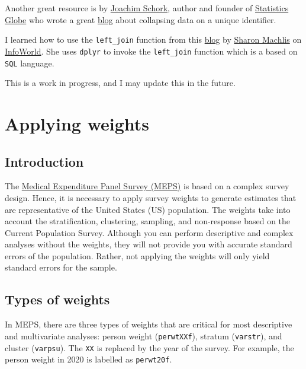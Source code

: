 \documentclass[
]{book}
\theoremstyle{definition}
\theoremstyle{definition}
\theoremstyle{definition}
\theoremstyle{definition}
\theoremstyle{remark}
\begin{document}
Another great resource is by \href{https://statisticsglobe.com/joachim-schork/}{Joachim Schork}, author and founder of \href{https://statisticsglobe.com/}{Statistics Globe} who wrote a great \href{https://statisticsglobe.com/sum-duplicate-rows-r}{blog} about collapsing data on a unique identifier.

I learned how to use the \texttt{left\_join} function from this \href{https://www.infoworld.com/article/3454356/how-to-merge-data-in-r-using-r-merge-dplyr-or-datatable.html}{blog} by \href{https://www.infoworld.com/author/Sharon-Machlis/}{Sharon Machlis} on \href{https://www.infoworld.com}{InfoWorld}. She uses \texttt{dplyr} to invoke the \texttt{left\_join} function which is a based on \texttt{SQL} language.

This is a work in progress, and I may update this in the future.

\hypertarget{weights}{%
\chapter{Applying weights}\label{weights}}

\hypertarget{introduction-2}{%
\section{Introduction}\label{introduction-2}}

The \href{https://www.meps.ahrq.gov/mepsweb/}{Medical Expenditure Panel Survey (MEPS)} is based on a complex survey design. Hence, it is necessary to apply survey weights to generate estimates that are representative of the United States (US) population. The weights take into account the stratification, clustering, sampling, and non-response based on the Current Population Survey. Although you can perform descriptive and complex analyses without the weights, they will not provide you with accurate standard errors of the population. Rather, not applying the weights will only yield standard errors for the sample.

\hypertarget{types-of-weights}{%
\section{Types of weights}\label{types-of-weights}}

In MEPS, there are three types of weights that are critical for most descriptive and multivariate analyses: person weight (\texttt{perwtXXf}), stratum (\texttt{varstr}), and cluster (\texttt{varpsu}). The \texttt{XX} is replaced by the year of the survey. For example, the person weight in 2020 is labelled as \texttt{perwt20f}.
\end{document}
